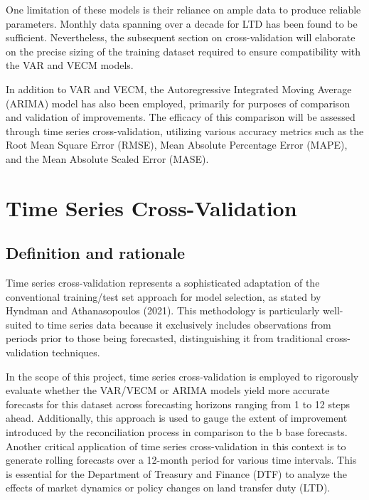 \documentclass[11pt,a4paper,]{article}
\begin{document}
One limitation of these models is their reliance on ample data to produce reliable parameters. Monthly data spanning over a decade for LTD has been found to be sufficient. Nevertheless, the subsequent section on cross-validation will elaborate on the precise sizing of the training dataset required to ensure compatibility with the VAR and VECM models.

In addition to VAR and VECM, the Autoregressive Integrated Moving Average (ARIMA) model has also been employed, primarily for purposes of comparison and validation of improvements. The efficacy of this comparison will be assessed through time series cross-validation, utilizing various accuracy metrics such as the Root Mean Square Error (RMSE), Mean Absolute Percentage Error (MAPE), and the Mean Absolute Scaled Error (MASE).

\section{Time Series Cross-Validation}\label{time-series-cross-validation}

\subsection{Definition and rationale}\label{definition-and-rationale}

Time series cross-validation represents a sophisticated adaptation of the conventional training/test set approach for model selection, as stated by Hyndman and Athanasopoulos (2021). This methodology is particularly well-suited to time series data because it exclusively includes observations from periods prior to those being forecasted, distinguishing it from traditional cross-validation techniques.

In the scope of this project, time series cross-validation is employed to rigorously evaluate whether the VAR/VECM or ARIMA models yield more accurate forecasts for this dataset across forecasting horizons ranging from 1 to 12 steps ahead. Additionally, this approach is used to gauge the extent of improvement introduced by the reconciliation process in comparison to the b base forecasts. Another critical application of time series cross-validation in this context is to generate rolling forecasts over a 12-month period for various time intervals. This is essential for the Department of Treasury and Finance (DTF) to analyze the effects of market dynamics or policy changes on land transfer duty (LTD).
\end{document}
